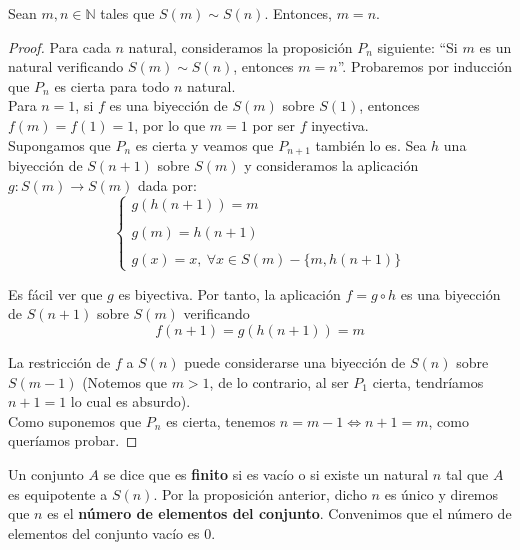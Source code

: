 \begin{prop}
    Sean $m,n \in \mathbb{N}$ tales que $S(m) \sim S(n)$. Entonces, $m = n$.
\end{prop}
\begin{proof}
    Para cada $n$ natural, consideramos la proposición $P_n$ siguiente: ``Si $m$ es un natural verificando $S(m) \sim S(n)$, entonces $m = n$''. Probaremos por inducción que $P_n$ es cierta para todo $n$ natural.\\
    
    Para $n=1$, si $f$ es una biyección de $S(m)$ sobre $S(1)$, entonces $f(m) = f(1) = 1$, por lo que $m=1$
    por ser $f$ inyectiva.\\
    
    Supongamos que $P_n$ es cierta y veamos que $P_{n+1}$ también lo es. Sea $h$ una biyección de $S(n+1)$ sobre $S(m)$
    y consideramos la aplicación $g:S(m) \longrightarrow S(m)$ dada por:
    \begin{equation*}
        \left\{ \begin{array}{lcc}
            g(h(n+1))=m \\ \\
            g(m)=h(n+1) \\ \\
            g(x)=x,~\forall x \in S(m)-\{m,h(n+1)\}
            \end{array}
        \right.
    \end{equation*}
    
    Es fácil ver que $g$ es biyectiva. Por tanto, la aplicación $f = g \circ h$ es una biyección de $S(n+1)$
    sobre $S(m)$ verificando
    \begin{equation*}
        f(n+1)=g(h(n+1))=m
    \end{equation*}
    
    La restricción de $f$ a $S(n)$ puede considerarse una biyección de $S(n)$ sobre $S(m-1)$
    (Notemos que $m > 1$, de lo contrario, al ser $P_1$ cierta, tendríamos $n+1=1$ lo cual es absurdo).\\
    
    Como suponemos que $P_n$ es cierta, tenemos $n=m-1 \Longleftrightarrow n+1=m$, como queríamos probar.
\end{proof}

\begin{definicion}
    Un conjunto $A$ se dice que es \textbf{finito} si es vacío o si existe un natural $n$ tal que $A$ es equipotente a $S(n)$. Por la proposición anterior, dicho $n$ es único y diremos que $n$ es el \textbf{número de elementos del conjunto}. Convenimos que el número de elementos del conjunto vacío es $0$.
\end{definicion}

